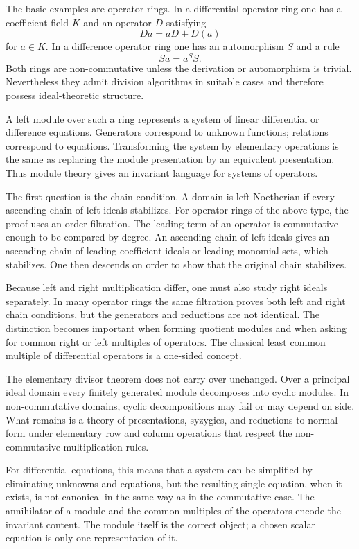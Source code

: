 \documentclass[12pt]{article}
\begin{document}
The basic examples are operator rings. In a differential operator ring one has a coefficient field
\(K\) and an operator \(D\) satisfying \[   D a=aD+D(a) \] for \(a\in K\). In a difference operator
ring one has an automorphism \(S\) and a rule \[   S a=a^S S. \] Both rings are non-commutative
unless the derivation or automorphism is trivial. Nevertheless they admit division algorithms in
suitable cases and therefore possess ideal-theoretic structure.


A left module over such a ring represents a system of linear differential or difference equations.
Generators correspond to unknown functions; relations correspond to equations. Transforming the
system by elementary operations is the same as replacing the module presentation by an equivalent
presentation. Thus module theory gives an invariant language for systems of operators.


The first question is the chain condition. A domain is left-Noetherian if every ascending chain of
left ideals stabilizes. For operator rings of the above type, the proof uses an order filtration.
The leading term of an operator is commutative enough to be compared by degree. An ascending chain
of left ideals gives an ascending chain of leading coefficient ideals or leading monomial sets,
which stabilizes. One then descends on order to show that the original chain stabilizes.


Because left and right multiplication differ, one must also study right ideals separately. In many
operator rings the same filtration proves both left and right chain conditions, but the generators
and reductions are not identical. The distinction becomes important when forming quotient modules
and when asking for common right or left multiples of operators. The classical least common multiple
of differential operators is a one-sided concept.


The elementary divisor theorem does not carry over unchanged. Over a principal ideal domain every
finitely generated module decomposes into cyclic modules. In non-commutative domains, cyclic
decompositions may fail or may depend on side. What remains is a theory of presentations, syzygies,
and reductions to normal form under elementary row and column operations that respect the
non-commutative multiplication rules.


For differential equations, this means that a system can be simplified by eliminating unknowns and
equations, but the resulting single equation, when it exists, is not canonical in the same way as in
the commutative case. The annihilator of a module and the common multiples of the operators encode
the invariant content. The module itself is the correct object; a chosen scalar equation is only one
representation of it.
\end{document}
